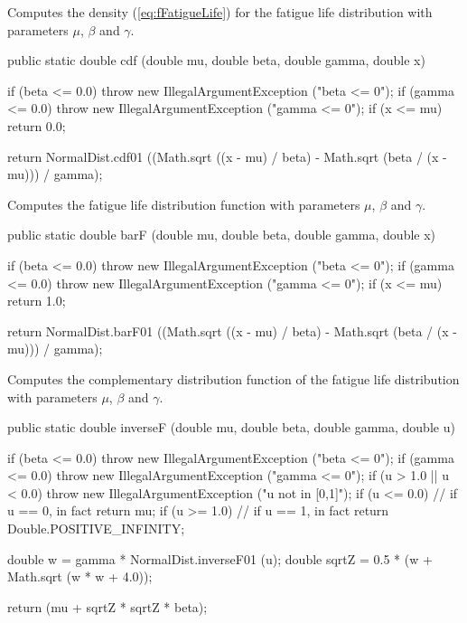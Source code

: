 \begin{tabb} Computes the density (\ref{eq:fFatigueLife}) for the
   fatigue life distribution with parameters $\mu$, $\beta$ and $\gamma$.
\end{tabb}
\begin{code}

   public static double cdf (double mu, double beta, double gamma, double x)\begin{hide} {
      if (beta <= 0.0)
         throw new IllegalArgumentException ("beta <= 0");
      if (gamma <= 0.0)
         throw new IllegalArgumentException ("gamma <= 0");
      if (x <= mu)
         return 0.0;

      return NormalDist.cdf01 ((Math.sqrt ((x - mu) / beta) - Math.sqrt (beta / (x - mu))) / gamma);
   }\end{hide}
\end{code}
\begin{tabb}
   Computes the fatigue life distribution
   function with parameters $\mu$, $\beta$ and $\gamma$.
 \end{tabb}
\begin{code}
   
   public static double barF (double mu, double beta, double gamma,
                              double x)\begin{hide} {
      if (beta <= 0.0)
         throw new IllegalArgumentException ("beta <= 0");
      if (gamma <= 0.0)
         throw new IllegalArgumentException ("gamma <= 0");
      if (x <= mu)
         return 1.0;

      return NormalDist.barF01 ((Math.sqrt ((x - mu) / beta) - Math.sqrt (beta / (x - mu))) / gamma);
   }\end{hide}
\end{code}
\begin{tabb}
   Computes the complementary distribution function of the
   fatigue life distribution with parameters $\mu$, $\beta$ and $\gamma$.
 \end{tabb}
\begin{code}
   
   public static double inverseF (double mu, double beta, double gamma,
                                  double u)\begin{hide} {
      if (beta <= 0.0)
         throw new IllegalArgumentException ("beta <= 0");
      if (gamma <= 0.0)
         throw new IllegalArgumentException ("gamma <= 0");
      if (u > 1.0 || u < 0.0)
          throw new IllegalArgumentException ("u not in [0,1]");
      if (u <= 0.0)    // if u == 0, in fact
          return mu;
      if (u >= 1.0)    // if u == 1, in fact
          return Double.POSITIVE_INFINITY;

      double w = gamma * NormalDist.inverseF01 (u);
      double sqrtZ = 0.5 * (w + Math.sqrt (w * w + 4.0));

      return (mu + sqrtZ * sqrtZ * beta);
   }\end{hide}
\end{code}
